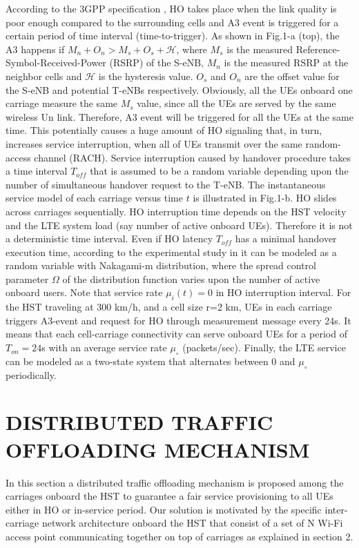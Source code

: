 \documentclass[journal]{IEEEtran}
\begin{document}
{According to the 3GPP specification \cite{3GPP_2013}, HO takes place when the link quality is poor enough compared to the surrounding cells and A3 event is triggered for a certain period of time interval (time-to-trigger). As shown in Fig.1-a (top), the A3 happens if ${M_n +O_n}>{M_s + O_s + \mathcal{H}}$, where $M_s$ is the measured Reference-Symbol-Received-Power (RSRP) of the S-eNB, $M_n$ is the measured RSRP at the neighbor cells and $\mathcal{H}$ is the hysteresis value. $O_s$ and $O_n$ are the offset value for the S-eNB and potential T-eNBs respectively. Obviously, all the UEs onboard one carriage measure the same $M_s$ value, since all the UEs are served by the same wireless Un link. Therefore, A3 event will be triggered for all the UEs at the same time. This potentially causes a huge amount of HO signaling that, in turn, increases service interruption, when all of UEs transmit over the same random-access channel (RACH). Service interruption caused by handover procedure takes a time interval $T_{off}$ that is assumed to be a random variable depending upon the number of simultaneous handover request to the T-eNB. The instantaneous service model of each carriage versus time $t$ is illustrated in Fig.1-b. HO slides across carriages sequentially. HO interruption time depends on the HST velocity and the LTE system load (say number of active onboard UEs). Therefore it is not a deterministic time interval. Even if HO latency $T_{off}$ has a minimal handover execution time, according to the experimental study in \cite{Parichehreh_2017} it can be modeled as a random variable with Nakagami-m distribution, where the spread control parameter $\Omega$ of the distribution function varies upon the number of active onboard users. Note that service rate $\mu_{i}(t)=0$ in HO interruption interval. For the HST traveling at 300 km/h, and a cell size r=2 km, UEs in each carriage triggers A3-event and request for HO through measurement message every 24s. It means that each cell-carriage connectivity can serve onboard UEs for a period of $T_{on}=24$s with an average service rate $\mu_{\circ}$ (packets/sec). Finally, the LTE service can be modeled as a two-state system that alternates between $0$ and $\mu_{\circ}$ periodically.

\section{DISTRIBUTED TRAFFIC OFFLOADING MECHANISM}
\label{sec3}
In this section a distributed traffic offloading mechanism is proposed among the carriages onboard the HST to guarantee a fair service provisioning to all UEs either in HO or in-service period. Our solution is motivated by the specific inter-carriage network architecture onboard the HST that consist of a set of N Wi-Fi access point communicating together on top of carriages as explained in section 2.

}
\end{document}
